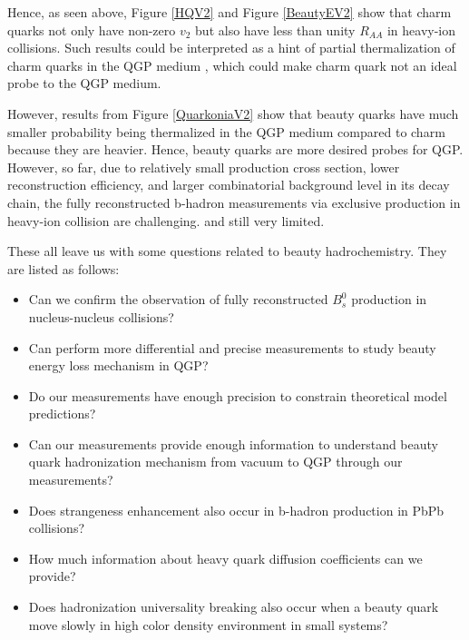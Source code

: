 
Hence, as seen above, Figure \ref{HQV2} and Figure \ref{BeautyEV2} show that charm quarks not only have non-zero $v_2$ but also have less than unity $R_{AA}$ in heavy-ion collisions. Such results could be interpreted as a hint of partial thermalization of charm quarks in the QGP medium \cite{CharmThermal}, which could make charm quark not an ideal probe to the QGP medium. 

However, results from Figure \ref{QuarkoniaV2} show that beauty quarks have much smaller probability being thermalized in the QGP medium compared to charm because they are heavier. Hence, beauty quarks are more desired probes for QGP. However, so far, due to relatively small production cross section, lower reconstruction efficiency, and larger combinatorial background level in its decay chain, the fully reconstructed b-hadron measurements via exclusive production in heavy-ion collision are challenging. and still very limited. 

These all leave us with some questions related to beauty hadrochemistry. They are listed as follows:

\begin{itemize}
\item Can we confirm the observation of fully reconstructed $B^0_s$ production in nucleus-nucleus collisions?
\item Can perform more differential and precise measurements to study beauty energy loss mechanism in QGP?
\item Do our measurements have enough precision to constrain theoretical model predictions?
\item Can our measurements provide enough information to understand beauty quark hadronization mechanism from vacuum to QGP through our measurements?
\item Does strangeness enhancement also occur in b-hadron production in PbPb collisions?
\item How much information about heavy quark diffusion coefficients can we provide?
\item Does hadronization universality breaking also occur when a beauty quark move slowly in high color density environment in small systems?
\end{itemize}


